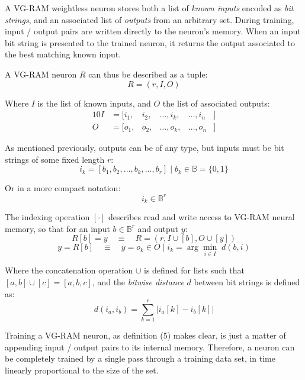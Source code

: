 \documentclass[twocolumn, 9pt]{jsproceedings}
\begin{document}
A VG-RAM weightless neuron stores both a list of {\it known inputs} encoded as {\it bit strings}, and an associated list of {\it outputs} from an arbitrary set. During training, input / output pairs are written directly to the neuron's memory. When an input bit string is presented to the trained neuron, it returns the output associated to the best matching known input.

A VG-RAM neuron \(R\) can thus be described as a tuple:
\begin{equation}
R = (r, I, O)
\end{equation}

Where \(I\) is the list of known inputs, and \(O\) the list of associated outputs:
\begin{alignat}{10}
I & = [i_1 , & i_2 , & \dotsc , i_k , & \dotsc , i_n & ] \\
O & = [o_1 , & o_2 , & \dotsc , o_k , & \dotsc , o_n & ]
\end{alignat}

As mentioned previously, outputs can be of any type, but inputs must be bit strings of some fixed length \(r\):
\begin{equation*}
i_k = [ b_1 , b_2 , \dotsc , b_k , \dotsc , b_r ] \; | \; b_k \in \mathbb{B} = \{ 0 , 1 \}
\end{equation*}

Or in a more compact notation:
\begin{equation}
i_k \in \mathbb{B}^r
\end{equation}

The indexing operation \([\cdot]\) describes read and write access to VG-RAM neural memory, so that for an input \(b \in \mathbb{B}^r\) and output \(y\):
\begin{equation}
R[b] = y \quad \equiv \quad R = (r, I \cup [b], O \cup [y])
\end{equation}
\begin{equation}
y = R[b] \quad \equiv \quad y = o_k \in O \; | \; i_k = \arg \min_{i \in I} { \; d ( b , i ) }
\end{equation}

Where the concatenation operation \(\cup\) is defined for lists such that \([a, b] \cup [c] = [a, b, c]\), and the {\it bitwise distance} \(d\) between bit strings is defined as:
\begin{equation}
d ( i_a , i_b ) = \sum_{k = 1}^{r} {| i_a[k] - i_b[k] |}
\end{equation}

Training a VG-RAM neuron, as definition (5) makes clear, is just a matter of appending input / output pairs to its internal memory. Therefore, a neuron can be completely trained by a single pass through a training data set, in time linearly proportional to the size of the set.
\end{document}
